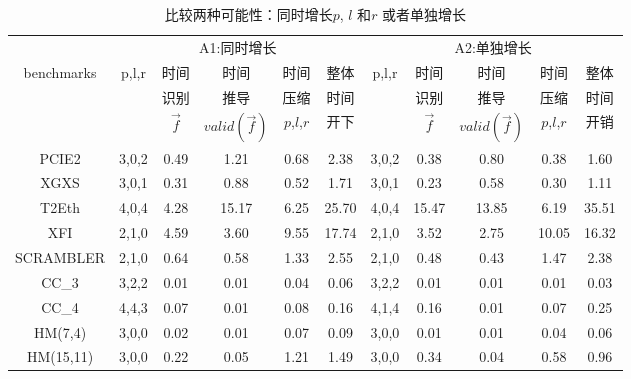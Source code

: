 \begin{table}[t]%
\caption{比较两种可能性：同时增长$p$, $l$ 和$r$ 或者单独增长}
\label{tab:comparing_simu_sepa}
\begin{tabular}{|c|c|c|c|c|c|c|c|c|c|c|}
\hline
                   & \multicolumn{5}{|c|}{A1:同时增长}                          &  \multicolumn{5}{|c|}{A2:单独增长}           \\\cline{2-11}
benchmarks         & p,l,r& 时间       & 时间            & 时间       &  整体   & p,l,r& 时间       & 时间            & 时间       & 整体  \\
                   &      & 识别       & 推导            & 压缩       &  时间   &      & 识别       & 推导            & 压缩       & 时间   \\
                   &      & $\vec{f}$  & $valid(\vec{f})$& $p$,$l$,$r$&  开下   &      & $\vec{f}$  & $valid(\vec{f})$& $p$,$l$,$r$& 开销   \\\hline\hline
PCIE2              & 3,0,2& 0.49       & 1.21            & 0.68       &  2.38   & 3,0,2& 0.38       & 0.80            & 0.38       & 1.60   \\\hline
XGXS               & 3,0,1& 0.31       & 0.88            & 0.52       &  1.71   & 3,0,1& 0.23       & 0.58            & 0.30       & 1.11   \\\hline
T2Eth              & 4,0,4& 4.28       & 15.17           & 6.25       &  25.70  & 4,0,4& 15.47      & 13.85           & 6.19       & 35.51  \\\hline
XFI                & 2,1,0& 4.59       & 3.60            & 9.55       & 17.74   & 2,1,0& 3.52       & 2.75            & 10.05      & 16.32  \\\hline
SCRAMBLER          & 2,1,0& 0.64       & 0.58            & 1.33       & 2.55    & 2,1,0& 0.48       & 0.43            & 1.47       & 2.38   \\\hline
CC\_3              & 3,2,2& 0.01       & 0.01            & 0.04       & 0.06    & 3,2,2& 0.01       & 0.01            & 0.01       & 0.03   \\\hline
CC\_4              & 4,4,3& 0.07       & 0.01            & 0.08       & 0.16    & 4,1,4& 0.16       & 0.01            & 0.07       & 0.25   \\\hline
HM(7,4)            & 3,0,0& 0.02       & 0.01            & 0.07       & 0.09    & 3,0,0& 0.01       & 0.01            & 0.04       & 0.06   \\\hline
HM(15,11)          & 3,0,0& 0.22       & 0.05            & 1.21       & 1.49    & 3,0,0& 0.34       & 0.04            & 0.58       & 0.96   \\\hline
\end{tabular}
\end{table}%

